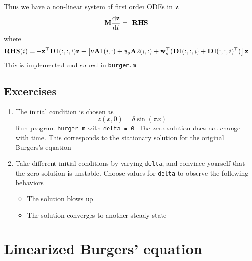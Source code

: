 \documentclass[12pt]{article}
\begin{document}
Thus we have a non-linear system of first order ODEs in ${\mathbf z}$
\begin{eqnarray*}
 {\mathbf M} \frac{\textrm{d} {\mathbf z}}{\textrm{d} t} = \textbf{ RHS} 
\end{eqnarray*}
where 
\begin{eqnarray*}
 \textbf{RHS}(i) = - {\mathbf z}^\top {\mathbf D}1(:,:,i) {\mathbf z} - \left[ \nu {\mathbf A}1(i,:) + u_s {\mathbf A}2(i,:) + {\mathbf w}_s^\top ({\mathbf D}1(:,:,i) + {\mathbf D}1(:,:,i)^\top) \right] {\mathbf z}
\end{eqnarray*}
This is implemented and solved in {\tt burger.m}

\subsection{Excercises}

\begin{enumerate}

\item The initial condition is chosen as
\[
z(x,0) = \delta \sin(\pi x)
\]
Run program {\tt burger.m} with {\tt delta = 0}. The zero solution does not change with time. This corresponds to the stationary solution for the original Burgers's equation.

\item Take different initial conditions by varying {\tt delta}, and convince yourself that the zero solution is unstable. Choose values for {\tt delta} to observe the following behaviors
   \begin{itemize}
    \item The solution blows up
    \item The solution converges to another steady state
   \end{itemize}
\end{enumerate}


\section{Linearized Burgers' equation}
\end{document}
